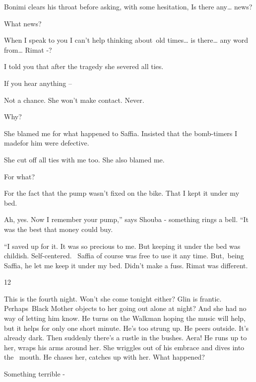 \documentclass[12pt]{book}
\begin{document}
Bonimi clears his throat before asking, with some hesitation, {\textquotedbl} Is there any{\dots} news?{\textquotedbl}

{\textquotedbl}What news?{\textquotedbl}

{\textquotedbl}When I speak to you I can't help thinking about~old times{\dots} is there{\dots} any word from{\dots}
Rimat -?{\textquotedbl}

{\textquotedbl}I told you that after the tragedy she severed all ties.{\textquotedbl}

{\textquotedbl}If you hear anything --{\textquotedbl}

{\textquotedbl}Not a chance. She won't make contact. Never.{\textquotedbl}

{\textquotedbl}Why?{\textquotedbl}

{\textquotedbl}She blamed me for what happened to Saffia. Insisted that the bomb-timers I madefor him were
defective.{\textquotedbl}

{\textquotedbl}She cut off all ties with me too. She also blamed me.{\textquotedbl}

{\textquotedbl}For what?{\textquotedbl}~

{\textquotedbl}For the fact that the pump wasn't fixed on the bike. That I kept it under my bed.{\textquotedbl}

{\textquotedbl}Ah, yes. Now I remember your pump,'' says Shouba - something rings a bell. ``It was the best that money
could buy.{\textquotedbl}

{}``I saved up for it. It was so precious to me. But keeping it under the bed was childish. Self-centered. \ Saffia of
course was free to use it any time. But,~being Saffia, he let me keep it under my bed. Didn't make a fuss. Rimat was
different.{\textquotedbl}


\bigskip

12~

This is the fourth night. Won't she come tonight either? Glin is frantic. Perhaps~Black Mother objects to her going out
alone at night? And she had no way of letting him know. He turns on the Walkman hoping the music will help, but it
helps for only one short minute. He's too strung up. He peers outside. It's already dark. Then suddenly there's a
rustle in the bushes. Aera! He runs up to her, wraps his arms around her. She wriggles out of his embrace and dives
into the \ mouth. He chases her, catches up with her. {\textquotedbl}What happened?{\textquotedbl}

{\textquotedbl}Something terrible -{\textquotedbl}
\end{document}
